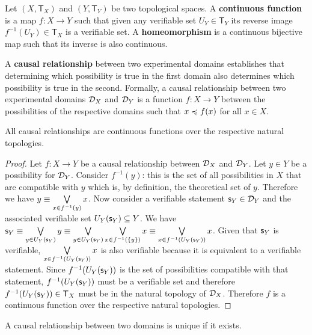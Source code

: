\documentclass[11pt,letterpaper,fleqn]{memoir} %
\begin{document}
\begin{mathSection}
	\begin{defn}
		Let $(X, \mathsf{T}_X)$ and $(Y, \mathsf{T}_Y)$ be two topological spaces. A \textbf{continuous function} is a map $f: X \to Y$ such that given any verifiable set $U_Y \in \mathsf{T}_Y$ its reverse image $f^{-1}(U_Y) \in \mathsf{T}_X$ is a verifiable set. A \textbf{homeomorphism} is a continuous bijective map such that its inverse is also continuous.
	\end{defn}
	\begin{defn}
		A \textbf{causal relationship} between two experimental domains establishes that determining which possibility is true in the first domain also determines which possibility is true in the second. Formally, a causal relationship between two experimental domains $\mathcal{D}_X$ and $\mathcal{D}_Y$ is a function $f : X \to Y$ between the possibilities of the respective domains such that $x \preccurlyeq f(x)$ for all $x \in X$.
	\end{defn}
	\begin{coro}
		All causal relationships are continuous functions over the respective natural topologies.
	\end{coro}
	\begin{proof}
		Let $f : X \to Y$ be a causal relationship between $\mathcal{D}_X$ and $\mathcal{D}_Y$. Let $y \in Y$ be a possibility for $\mathcal{D}_Y$. Consider $f^{-1}(y)$: this is the set of all possibilities in $X$ that are compatible with $y$ which is, by definition, the theoretical set of $y$. Therefore we have $y \equiv \bigvee\limits_{x \in f^{-1}(y)} x$. Now consider a verifiable statement $\mathsf{s}_Y \in \mathcal{D}_Y$ and the associated verifiable set $U_Y(\mathsf{s}_Y) \subseteq Y$. We have $\mathsf{s}_Y \equiv \bigvee\limits_{y \in U_Y(\mathsf{s}_Y)} y \equiv \bigvee\limits_{y \in U_Y(\mathsf{s}_Y)} \bigvee\limits_{x \in f^{-1}(\{y\})} x \equiv \bigvee\limits_{x \in f^{-1}(U_Y(\mathsf{s}_Y))} x$. Given that $\mathsf{s}_Y$ is verifiable, $\bigvee\limits_{x \in f^{-1}(U_Y(\mathsf{s}_Y))} x$ is also verifiable because it is equivalent to a verifiable statement. Since $f^{-1}(U_Y(\mathsf{s}_Y))$ is the set of possibilities compatible with that statement, $f^{-1}(U_Y(\mathsf{s}_Y))$ must be a verifiable set and therefore $f^{-1}(U_Y(\mathsf{s}_Y)) \in \mathsf{T}_X$ must be in the natural topology of $\mathcal{D}_{X}$. Therefore $f$ is a continuous function over the respective natural topologies.
	\end{proof}
	\begin{coro}
		A causal relationship between two domains is unique if it exists.

\end{coro}
\end{mathSection}
\end{document}
